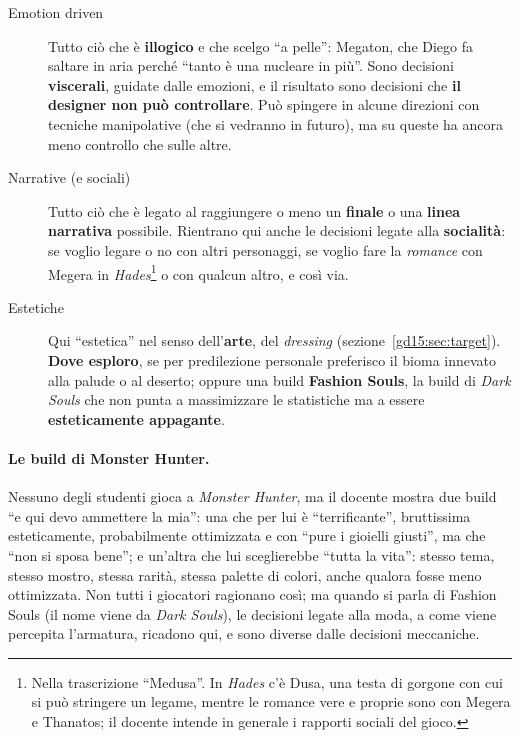 \begin{description}
  \item[Emotion driven] Tutto ciò che è \textbf{illogico} e che scelgo
        ``a pelle'': Megaton, che Diego fa saltare in aria perché ``tanto è
        una nucleare in più''. Sono decisioni \textbf{viscerali}, guidate
        dalle emozioni, e il risultato sono decisioni che \textbf{il
        designer non può controllare}. Può spingere in alcune direzioni con
        tecniche manipolative (che si vedranno in futuro), ma su queste ha
        ancora meno controllo che sulle altre.
  \item[Narrative (e sociali)] Tutto ciò che è legato al raggiungere o
        meno un \textbf{finale} o una \textbf{linea narrativa} possibile.
        Rientrano qui anche le decisioni legate alla \textbf{socialità}: se
        voglio legare o no con altri personaggi, se voglio fare la
        \emph{romance} con Megera in \emph{Hades}\footnote{Nella trascrizione
        ``Medusa''. In \emph{Hades} c'è Dusa, una testa di gorgone con cui
        si può stringere un legame, mentre le romance vere e proprie sono con
        Megera e Thanatos; il docente intende in generale i rapporti
        sociali del gioco.} o con qualcun
        altro, e così via.
  \item[Estetiche] Qui ``estetica'' nel senso dell'\textbf{arte}, del
        \emph{dressing} (sezione~\ref{gd15:sec:target}). \textbf{Dove
        esploro}, se per predilezione personale preferisco il bioma innevato
        alla palude o al deserto; oppure una build \textbf{Fashion Souls}, la
        build di \emph{Dark Souls} che non punta a massimizzare le
        statistiche ma a essere \textbf{esteticamente appagante}.
\end{description}

\paragraph{Le build di Monster Hunter.} Nessuno degli studenti gioca a
\emph{Monster Hunter}, ma il docente mostra due build ``e qui devo ammettere
la mia'': una che per lui è ``terrificante'', bruttissima esteticamente,
probabilmente ottimizzata e con ``pure i gioielli giusti'', ma che ``non si
sposa bene''; e un'altra che lui sceglierebbe ``tutta la vita'': stesso
tema, stesso mostro, stessa rarità, stessa palette di colori, anche qualora
fosse meno ottimizzata. Non tutti i giocatori ragionano così; ma quando si
parla di Fashion Souls (il nome viene da \emph{Dark Souls}), le decisioni
legate alla moda, a come viene percepita l'armatura, ricadono qui, e sono
diverse dalle decisioni meccaniche.

